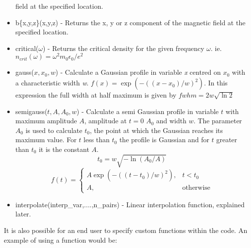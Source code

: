\documentclass[12pt,a4paper]{article}
\newcommand{\inlinecode}[1]{{\color{warwickred} \bf\texttt{#1}}}
\begin{document}
\begin{itemize}
    field at the specified location.
\item b\{x,y,z\}(x,y,z) - Returns the x, y or z component of the magnetic
    field at the specified location.
\item critical($\omega$) - Returns the critical density for the given
    frequency $\omega$. ie. $n_{crit}(\omega) = \omega^2 m_0 \epsilon_0 / e^2$
\item gauss($x,x_0,w$) - Calculate a Gaussian profile in variable
    {\it x} centred on {\it $x_0$} with a characteristic width {\it w}.
    $f(x) = \exp{(-((x-x_0)/w)^2)}$. In this expression the
    full width at half maximum is given by $fwhm = 2 w \sqrt{\ln{2}}$
\item semigauss($t,A,A_0,w$) - Calculate a semi Gaussian profile in variable
    $t$ with maximum amplitude $A$, amplitude at $t=0$ $A_0$ and width $w$.
    The parameter $A_0$ is used to calculate $t_0$, the point at which the
    Gaussian reaches its maximum value. For $t$ less than $t_0$ the profile
    is Gaussian and for $t$ greater than $t_0$ it is the constant $A$.
\[
t_0 = w\sqrt{-\ln{(A_0/A)}}
\]\[
f(t) =
\begin{cases}
A \exp{(-((t-t_0)/w)^2)}, & t < t_0 \\
A, & \mbox{otherwise}
\end{cases}
\]
\item interpolate(interp\_var,....,n\_pairs) - Linear interpolation function,
  explained later.
\end{itemize}

It is also possible for an end user to specify custom functions within the
code. An example of using a function would be:\\
\indent\inlinecode{length\_x = exp(pi)}\\
\end{document}
